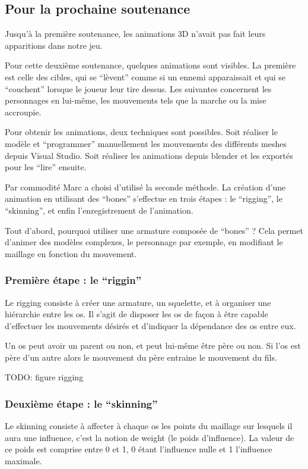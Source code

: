 \documentclass[11pt]{report}
\begin{document}
\subsection{Pour la prochaine soutenance}

Jusqu’à la première soutenance, les animations 3D n’avait pas fait leurs apparitions dans notre jeu.

Pour cette deuxième soutenance, quelques animations sont visibles. La première est celle des cibles, qui se ``lèvent'' comme si un ennemi apparaissait et qui se ``couchent'' lorsque le joueur leur tire dessus. Les suivantes concernent les personnages en lui-même, les mouvements tels que la marche ou la mise accroupie. 

Pour obtenir les animations, deux techniques sont possibles. Soit réaliser le modèle et ``programmer'' manuellement les mouvements des différents meshes depuis Visual Studio. Soit réaliser les animations depuis blender et les exportés pour les ``lire'' ensuite.

Par commodité Marc a choisi d’utilisé la seconde méthode. La création d’une animation en utilisant des ``bones''  s’effectue en trois étapes : le ``rigging'', le ``skinning'', et enfin l’enregistrement de l’animation.

Tout d’abord, pourquoi utiliser une armature composée de ``bones'' ?  Cela permet d’animer des modèles complexes, le personnage par exemple, en modifiant le maillage en fonction du mouvement.

\subsubsection{Première étape : le ``riggin''}

Le rigging consiste à créer une armature, un squelette, et à organiser une hiérarchie entre les os.
Il s’agit de disposer les os de façon à être capable d’effectuer les mouvements désirés et d’indiquer la dépendance des os entre eux.

Un os peut avoir un parent ou non, et peut lui-même être père ou non. Si l’os est père d’un autre alors le mouvement du père entraine le mouvement du fils.

TODO: figure rigging

\subsubsection{Deuxième étape : le ``skinning''}

Le skinning consiste à affecter à chaque os les points du maillage sur lesquels il aura une influence, c’est la notion de weight (le poids d’influence). La valeur de ce poids est comprise entre 0 et 1, 0 étant l’influence nulle et 1 l’influence maximale.
\end{document}
